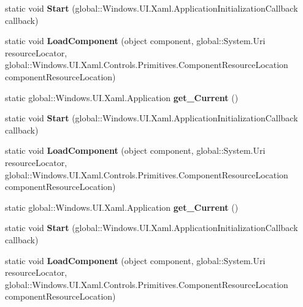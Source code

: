 \begin{DoxyCompactItemize}
\item 
\mbox{\label{class_windows_1_1_u_i_1_1_xaml_1_1_application_a189d758fa0e7520f135ecd26a2870c89}} 
static void {\bfseries Start} (global\+::\+Windows.\+U\+I.\+Xaml.\+Application\+Initialization\+Callback callback)
\item 
\mbox{\label{class_windows_1_1_u_i_1_1_xaml_1_1_application_a4be9e0fc67a57424825b3e404fe57c2d}} 
static void {\bfseries Load\+Component} (object component, global\+::\+System.\+Uri resource\+Locator, global\+::\+Windows.\+U\+I.\+Xaml.\+Controls.\+Primitives.\+Component\+Resource\+Location component\+Resource\+Location)
\item 
\mbox{\label{class_windows_1_1_u_i_1_1_xaml_1_1_application_a67de5f31e8c62b36f27fe9170f5ac9fb}} 
static global\+::\+Windows.\+U\+I.\+Xaml.\+Application {\bfseries get\+\_\+\+Current} ()
\item 
\mbox{\label{class_windows_1_1_u_i_1_1_xaml_1_1_application_a189d758fa0e7520f135ecd26a2870c89}} 
static void {\bfseries Start} (global\+::\+Windows.\+U\+I.\+Xaml.\+Application\+Initialization\+Callback callback)
\item 
\mbox{\label{class_windows_1_1_u_i_1_1_xaml_1_1_application_a4be9e0fc67a57424825b3e404fe57c2d}} 
static void {\bfseries Load\+Component} (object component, global\+::\+System.\+Uri resource\+Locator, global\+::\+Windows.\+U\+I.\+Xaml.\+Controls.\+Primitives.\+Component\+Resource\+Location component\+Resource\+Location)
\item 
\mbox{\label{class_windows_1_1_u_i_1_1_xaml_1_1_application_a67de5f31e8c62b36f27fe9170f5ac9fb}} 
static global\+::\+Windows.\+U\+I.\+Xaml.\+Application {\bfseries get\+\_\+\+Current} ()
\item 
\mbox{\label{class_windows_1_1_u_i_1_1_xaml_1_1_application_a189d758fa0e7520f135ecd26a2870c89}} 
static void {\bfseries Start} (global\+::\+Windows.\+U\+I.\+Xaml.\+Application\+Initialization\+Callback callback)
\item 
\mbox{\label{class_windows_1_1_u_i_1_1_xaml_1_1_application_a4be9e0fc67a57424825b3e404fe57c2d}} 
static void {\bfseries Load\+Component} (object component, global\+::\+System.\+Uri resource\+Locator, global\+::\+Windows.\+U\+I.\+Xaml.\+Controls.\+Primitives.\+Component\+Resource\+Location component\+Resource\+Location)
\end{DoxyCompactItemize}
